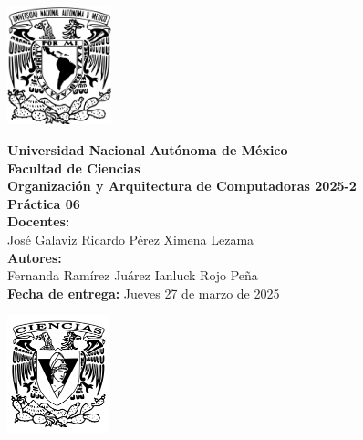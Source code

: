 \documentclass[12pt,letterpaper]{article}
\begin{document}
\begin{center}
\newcommand{\imp}{\rightarrow}
\newcommand{\vp}{\varphi}
  \begin{minipage}{3cm}
    \begin{center}
      \includegraphics[height=3.4cm]{../unam_logo.png}
    \end{center}
  \end{minipage}\hfill
  \begin{minipage}{10cm}
    \begin{center}
      \textbf{\Large Universidad Nacional Autónoma de México}\\[0.2cm]
      \textbf{\large Facultad de Ciencias}\\[0.2cm]
      \textbf{Organización y Arquitectura de Computadoras 2025-2}\\[0.4cm]
      \textbf{\Large Práctica 06}\\[0.1cm]
      \textbf{Docentes:}\\
      José Galaviz \hspace{1em} Ricardo Pérez \hspace{1em} Ximena Lezama\\[0.3cm]
      \textbf{Autores:}\\
      Fernanda Ramírez Juárez \quad Ianluck Rojo Peña\\[0.3cm]
      \textbf{Fecha de entrega:} Jueves 27 de marzo de 2025
    \end{center}
  \end{minipage}\hfill
  \begin{minipage}{3cm}
    \begin{center}
      \includegraphics[height=3.4cm]{../fc_logo.png}
    \end{center}
  \end{minipage}
\end{center}
\end{document}
